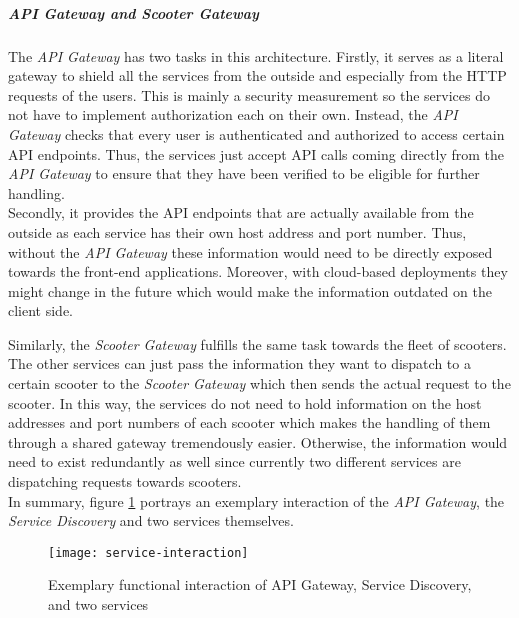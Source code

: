 \documentclass[12pt,a4paper,twoside]{report}
\begin{document}
\subparagraph{API Gateway and Scooter Gateway}
The \textit{API Gateway} has two tasks in this architecture.
Firstly, it serves as a literal gateway to shield all the services from
the outside and especially from the HTTP requests of the users.
This is mainly a security measurement so the services do not have to
implement authorization each on their own. Instead, the \textit{API Gateway}
checks that every user is authenticated and authorized to access certain
API endpoints. Thus, the services just accept API calls coming directly from
the \textit{API Gateway} to ensure that they have been verified to be eligible
for further handling.\\
Secondly, it provides the API endpoints that are actually available from the
outside as each service has their own host address and port number.
Thus, without the \textit{API Gateway} these information would need to be
directly exposed towards the front-end applications. Moreover, with cloud-based
deployments they might change in the future which would make the information
outdated on the client side.

Similarly, the \textit{Scooter Gateway} fulfills the same task towards the
fleet of scooters. The other services can just pass the
information they want to dispatch to a certain scooter to the
\textit{Scooter Gateway} which then sends the actual request to the scooter.
In this way, the services do not need to hold information on the host addresses
and port numbers of each scooter which makes the handling of them through
a shared gateway tremendously easier. Otherwise, the information would need
to exist redundantly as well since currently two different services are
dispatching requests towards scooters.\\

In summary, figure \ref{fig:service-interaction} portrays an exemplary interaction of the
\textit{API Gateway}, the \textit{Service Discovery} and two services themselves.

\begin{figure}[htb]
\centering
\texttt{[image: service-interaction]}
\caption{Exemplary functional interaction of API Gateway, Service Discovery, and two services}
\label{fig:service-interaction}
\end{figure}
\end{document}
